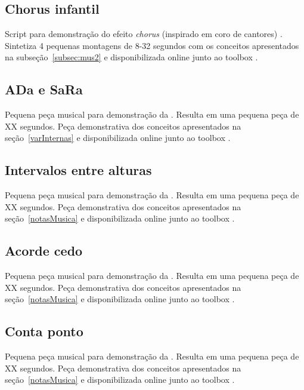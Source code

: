 \clearpage

\subsection{Chorus infantil}\label{ap:chorus}
Script para demonstração do efeito \emph{chorus} (inspirado em coro de cantores) . Sintetiza 4 pequenas montagens de 8-32 segundos com os conceitos apresentados na subseção~\ref{subsec:mus2} e disponibilizada online junto ao toolbox \massa.\cite{MASSA}


\clearpage

\subsection{ADa e SaRa}\label{ap:ada}
Pequena peça musical para demonstração da . Resulta em uma pequena peça de XX segundos. Peça demonstrativa dos conceitos apresentados na seção~\ref{varInternas} e disponibilizada online junto ao toolbox \massa.



\clearpage
\subsection{Intervalos entre alturas}\label{ap:intervalos}
Pequena peça musical para demonstração da . Resulta em uma pequena peça de XX segundos. Peça demonstrativa dos conceitos apresentados na seção~\ref{notasMusica} e disponibilizada online junto ao toolbox \massa.


\clearpage
\subsection{Acorde cedo}\label{ap:acorde}
Pequena peça musical para demonstração da . Resulta em uma pequena peça de XX segundos. Peça demonstrativa dos conceitos apresentados na seção~\ref{notasMusica} e disponibilizada online junto ao toolbox \massa.

\clearpage

\subsection{Conta ponto}\label{ap:conta}
Pequena peça musical para demonstração da . Resulta em uma pequena peça de XX segundos. Peça demonstrativa dos conceitos apresentados na seção~\ref{notasMusica} e disponibilizada online junto ao toolbox \massa.


